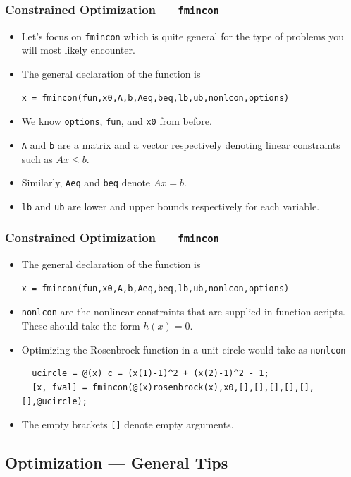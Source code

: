 \documentclass[11pt,xcolor={svgnames},aspectratio=169,usepdftitle=false,notheorems]{beamer}
\begin{document}
\begin{frame}[fragile]
  \frametitle{Constrained Optimization --- \texttt{fmincon}}
\begin{itemize}
  \item Let's focus on \verb;fmincon; which is quite general for the type of problems you will most likely encounter.
  \item The general declaration of the function is
\begin{lstlisting}
x = fmincon(fun,x0,A,b,Aeq,beq,lb,ub,nonlcon,options)
\end{lstlisting}
  \item We know \verb;options;, \verb;fun;, and \verb;x0; from before.
  \item \verb;A; and \verb;b; are a matrix and a vector respectively denoting linear constraints such as $Ax\leq b$.
  \item Similarly, \verb;Aeq; and \verb;beq; denote $Ax = b$.
  \item \verb;lb; and \verb;ub; are lower and upper bounds respectively for each variable.
\end{itemize}
\end{frame}

\begin{frame}[fragile]
  \frametitle{Constrained Optimization --- \texttt{fmincon}}
\begin{itemize}
  \item The general declaration of the function is
\begin{lstlisting}
x = fmincon(fun,x0,A,b,Aeq,beq,lb,ub,nonlcon,options)
\end{lstlisting}
  \item \verb;nonlcon; are the nonlinear constraints that are supplied in function scripts. These should take the form $h(x) = 0$.
  \item Optimizing the Rosenbrock function in a unit circle would take as \verb;nonlcon;
  \begin{lstlisting}
  ucircle = @(x) c = (x(1)-1)^2 + (x(2)-1)^2 - 1;
  [x, fval] = fmincon(@(x)rosenbrock(x),x0,[],[],[],[],[],[],@ucircle);
  \end{lstlisting}
  \item The empty brackets \verb;[]; denote empty arguments.
\end{itemize}
\end{frame}

\subsection{Optimization --- General Tips}
\end{document}
